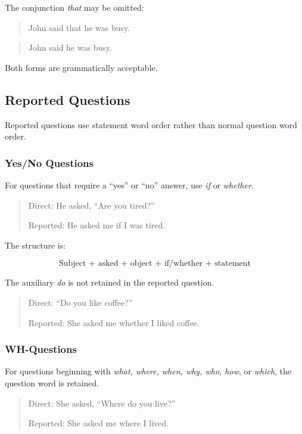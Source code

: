 The conjunction \textit{that} may be omitted:

\begin{quotation}
John said that he was busy.
\end{quotation}

\begin{quotation}
John said he was busy.
\end{quotation}

Both forms are grammatically acceptable.


\subsection{Reported Questions}

Reported questions use statement word order rather than normal question
word order.

\subsubsection{Yes/No Questions}

For questions that require a ``yes'' or ``no'' answer, use \textit{if} or
\textit{whether}.

\begin{quotation}
Direct: He asked, ``Are you tired?''

Reported: He asked me if I was tired.
\end{quotation}

The structure is:

\[
\text{Subject + asked + object + if/whether + statement}
\]

The auxiliary \textit{do} is not retained in the reported question.

\begin{quotation}
Direct: ``Do you like coffee?''

Reported: She asked me whether I liked coffee.
\end{quotation}


\subsubsection{WH-Questions}

For questions beginning with \textit{what, where, when, why, who, how},
or \textit{which}, the question word is retained.

\begin{quotation}
Direct: She asked, ``Where do you live?''

Reported: She asked me where I lived.
\end{quotation}


